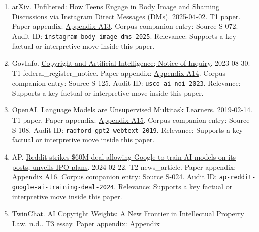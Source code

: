 \documentclass[
  american,
  11pt,
  letterpaper,
]{article}
\begin{document}
\begin{enumerate}
  \texttt{waller-anderson-online-polarization-2020}. Relevance: Supports
  a key factual or interpretive move inside this paper.
\item
  arXiv. \href{https://arxiv.org/abs/2504.02176}{Unfiltered: How Teens
  Engage in Body Image and Shaming Discussions via Instagram Direct
  Messages (DMs)}. 2025-04-02. T1 paper. Paper appendix:
  \hyperref[appendix-a13-unfiltered-how-teens-engage-in-body-image-and-shaming-discussions-via-instagram-direct-messages-dms]{Appendix
  A13}. Corpus companion entry: Source S-072. Audit ID:
  \texttt{instagram-body-image-dms-2025}. Relevance: Supports a key
  factual or interpretive move inside this paper.
\item
  GovInfo.
  \href{https://www.govinfo.gov/content/pkg/FR-2023-08-30/pdf/2023-18624.pdf}{Copyright
  and Artificial Intelligence; Notice of Inquiry}. 2023-08-30. T1
  federal\_register\_notice. Paper appendix:
  \hyperref[appendix-a14-copyright-and-artificial-intelligence-notice-of-inquiry]{Appendix
  A14}. Corpus companion entry: Source S-125. Audit ID:
  \texttt{usco-ai-noi-2023}. Relevance: Supports a key factual or
  interpretive move inside this paper.
\item
  OpenAI.
  \href{https://cdn.openai.com/better-language-models/language_models_are_unsupervised_multitask_learners.pdf}{Language
  Models are Unsupervised Multitask Learners}. 2019-02-14. T1 paper.
  Paper appendix:
  \hyperref[appendix-a15-language-models-are-unsupervised-multitask-learners]{Appendix
  A15}. Corpus companion entry: Source S-108. Audit ID:
  \texttt{radford-gpt2-webtext-2019}. Relevance: Supports a key factual
  or interpretive move inside this paper.
\item
  AP.
  \href{https://apnews.com/article/a7f131c7cb4225307134ef21d3c6a708}{Reddit
  strikes \$60M deal allowing Google to train AI models on its posts,
  unveils IPO plans}. 2024-02-22. T2 news\_article. Paper appendix:
  \hyperref[appendix-a16-reddit-strikes-60m-deal-allowing-google-to-train-ai-models-on-its-posts-unveils-ipo-plans]{Appendix
  A16}. Corpus companion entry: Source S-024. Audit ID:
  \texttt{ap-reddit-google-ai-training-deal-2024}. Relevance: Supports a
  key factual or interpretive move inside this paper.
\item
  TwinChat.
  \href{https://medium.com/twinchat/ai-copyright-weights-a-new-frontier-in-intellectual-property-law-d8ee1b6c55ee}{AI
  Copyright Weights: A New Frontier in Intellectual Property Law}. n.d..
  T3 essay. Paper appendix:
  \hyperref[appendix-a17-ai-copyright-weights-a-new-frontier-in-intellectual-property-law]{Appendix
}
\end{enumerate}
\end{document}
